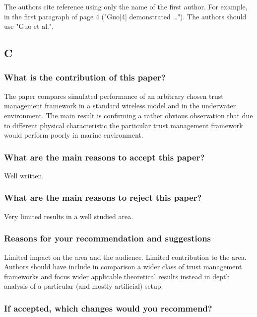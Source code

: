 \documentclass[runningheads,a4paper]{llncs}
\begin{document}
The authors cite reference \cite{Guo11} using only the name of the first author. For example, in the first paragraph of page 4 ("Guo[4] demonstrated …"). The authors should use "Guo et al.".


\subsection{C}

\subsubsection{What is the contribution of this paper?}

The paper compares simulated performance of an arbitrary chosen trust management framework in a standard wireless model and in the underwater environment.
The main result is confirming a rather obvious observation that due to different physical characteristic the particular trust management framework would perform poorly in marine environment.

\subsubsection{What are the main reasons to accept this paper?}

Well written.

\subsubsection{What are the main reasons to reject this paper?}

Very limited results in a well studied area.

\subsubsection{Reasons for your recommendation and suggestions}

Limited impact on the area and the audience. Limited contribution to the area.
Authors should have include in comparison a wider class of trust management frameworks and focus wider applicable theoretical results instead in depth analysis of a particular (and mostly artificial) setup.

\subsubsection{If accepted, which changes would you recommend?}
\end{document}
